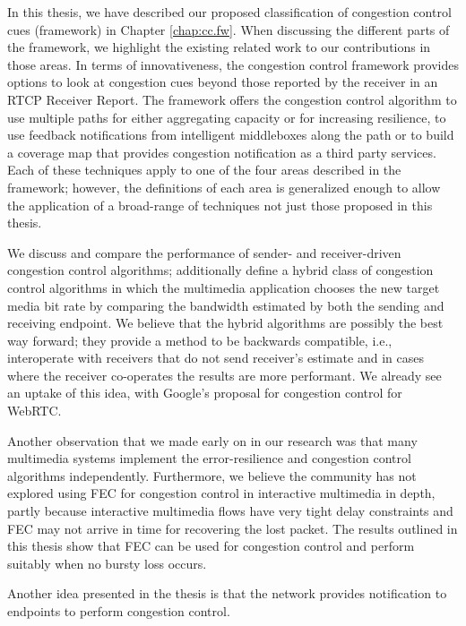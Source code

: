 In this thesis, we have described our proposed classification of congestion
control cues (framework) in Chapter \ref{chap:cc.fw}. When discussing the
different parts of the framework, we highlight the existing related work to
our contributions in those areas. In terms of innovativeness, the congestion
control framework provides options to look at congestion cues beyond those
reported by the receiver in an RTCP Receiver Report. The framework offers the
congestion control algorithm to use multiple paths for either aggregating
capacity or for increasing resilience, to use feedback notifications from
intelligent middleboxes along the path or to build a coverage map that
provides congestion notification as a third party services. Each of these
techniques apply to one of the four areas described in the framework; however,
the definitions of each area is generalized enough to allow the application of
a broad-range of techniques not just those proposed in this thesis.


We discuss and compare the performance of sender- and receiver-driven
congestion control algorithms; additionally define a hybrid class of
congestion control algorithms in which the multimedia application chooses the
new target media bit rate by comparing the bandwidth estimated by both the
sending and receiving endpoint. We believe that the hybrid algorithms are
possibly the best way forward; they provide a method to be backwards
compatible, i.e., interoperate with receivers that do not send receiver’s
estimate and in cases where the receiver co-operates the results are more
performant. We already see an uptake of this idea, with Google’s proposal for
congestion control for WebRTC.

Another observation that we made early on in our research was that many
multimedia systems implement the error-resilience and congestion control
algorithms independently. Furthermore, we believe the community has not
explored using FEC for congestion control in interactive multimedia in depth,
partly because interactive multimedia flows have very tight delay constraints
and FEC may not arrive in time for recovering the lost packet. The results
outlined in this thesis show that FEC can be used for congestion control and
perform suitably when no bursty loss occurs. 

Another idea presented in the thesis is that the network provides notification
to endpoints to perform congestion control. 


